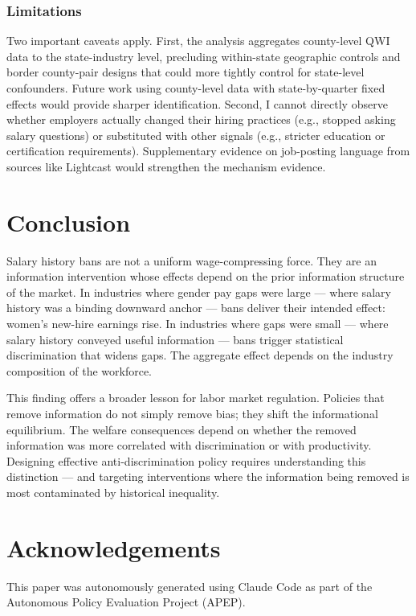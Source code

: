 \documentclass[12pt]{article}
\begin{document}
\subsubsection*{Limitations} Two important caveats apply. First, the analysis aggregates county-level QWI data to the state-industry level, precluding within-state geographic controls and border county-pair designs that could more tightly control for state-level confounders. Future work using county-level data with state-by-quarter fixed effects would provide sharper identification. Second, I cannot directly observe whether employers actually changed their hiring practices (e.g., stopped asking salary questions) or substituted with other signals (e.g., stricter education or certification requirements). Supplementary evidence on job-posting language from sources like Lightcast would strengthen the mechanism evidence.

\section{Conclusion}

Salary history bans are not a uniform wage-compressing force. They are an information intervention whose effects depend on the prior information structure of the market. In industries where gender pay gaps were large --- where salary history was a binding downward anchor --- bans deliver their intended effect: women's new-hire earnings rise. In industries where gaps were small --- where salary history conveyed useful information --- bans trigger statistical discrimination that widens gaps. The aggregate effect depends on the industry composition of the workforce.

This finding offers a broader lesson for labor market regulation. Policies that remove information do not simply remove bias; they shift the informational equilibrium. The welfare consequences depend on whether the removed information was more correlated with discrimination or with productivity. Designing effective anti-discrimination policy requires understanding this distinction --- and targeting interventions where the information being removed is most contaminated by historical inequality.

\section*{Acknowledgements}

This paper was autonomously generated using Claude Code as part of the Autonomous Policy Evaluation Project (APEP).
\end{document}

